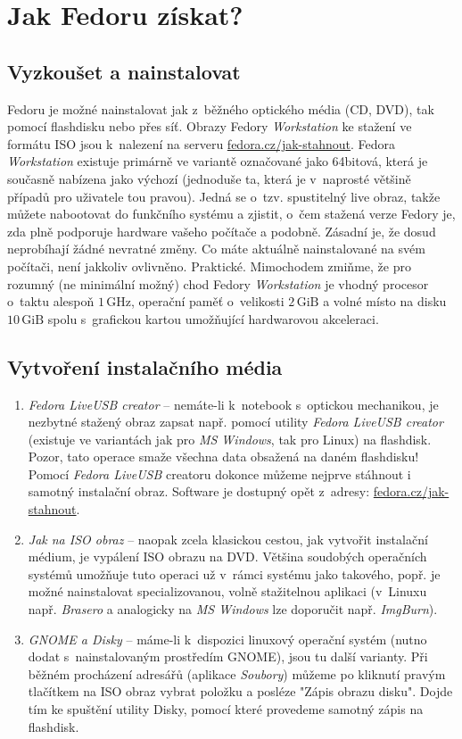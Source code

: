 \chapter*{Jak Fedoru získat?}

\section*{Vyzkoušet a nainstalovat}
Fedoru je možné nainstalovat jak z~běžného optického média (CD, DVD), tak pomocí flashdisku nebo přes síť. Obrazy Fedory \emph{Workstation} ke stažení ve formátu ISO jsou k~nalezení na serveru \url{fedora.cz/jak-stahnout}. Fedora \emph{Workstation} existuje primárně ve variantě označované jako 64bitová, která je současně nabízena jako výchozí (jednoduše ta, která je v~naprosté většině případů pro uživatele tou pravou). Jedná se o~tzv. spustitelný live obraz, takže můžete nabootovat do funkčního systému a zjistit, o~čem stažená verze Fedory je, zda plně podporuje hardware vašeho počítače a podobně. Zásadní je, že dosud neprobíhají žádné nevratné změny. Co máte aktuálně nainstalované na svém počítači, není jakkoliv ovlivněno. Praktické. Mimochodem zmiňme, že pro rozumný (ne minimální možný) chod Fedory \emph{Workstation} je vhodný procesor o~taktu alespoň $1\,\mathrm{GHz}$, operační paměť o~velikosti $2\,\mathrm{GiB}$ a volné místo na disku $10\,\mathrm{GiB}$ spolu s~grafickou kartou umožňující hardwarovou akceleraci.

\section*{Vytvoření instalačního média}
\begin{enumerate}

\item\emph{Fedora LiveUSB creator} -- nemáte-li k~notebook s~optickou mechanikou, je nezbytné stažený obraz zapsat např. pomocí utility \emph{Fedora LiveUSB creator} (existuje ve variantách jak pro \emph{MS Windows}, tak pro Linux) na flashdisk. Pozor, tato operace smaže všechna data obsažená na daném flashdisku! Pomocí \emph{Fedora LiveUSB} creatoru dokonce můžeme nejprve stáhnout i samotný instalační obraz. Software je dostupný opět z~adresy: \url{fedora.cz/jak-stahnout}.

\item\emph{Jak na ISO obraz} -- naopak zcela klasickou cestou, jak vytvořit instalační médium, je vypálení ISO obrazu na DVD. Většina soudobých operačních systémů umožňuje tuto operaci už v~rámci systému jako takového, popř. je možné nainstalovat specializovanou, volně stažitelnou aplikaci (v~Linuxu např. \emph{Brasero} a analogicky na \emph{MS Windows} lze doporučit např. \emph{ImgBurn}).

\item\emph{GNOME a Disky} -- máme-li k~dispozici linuxový operační systém (nutno dodat s~nainstalovaným prostředím GNOME), jsou tu další varianty. Při běžném procházení adresářů (aplikace \emph{Soubory}) můžeme po kliknutí pravým tlačítkem na ISO obraz vybrat položku  a posléze "Zápis obrazu disku". Dojde tím ke spuštění utility Disky, pomocí které provedeme samotný zápis na flashdisk.
\end{enumerate}

